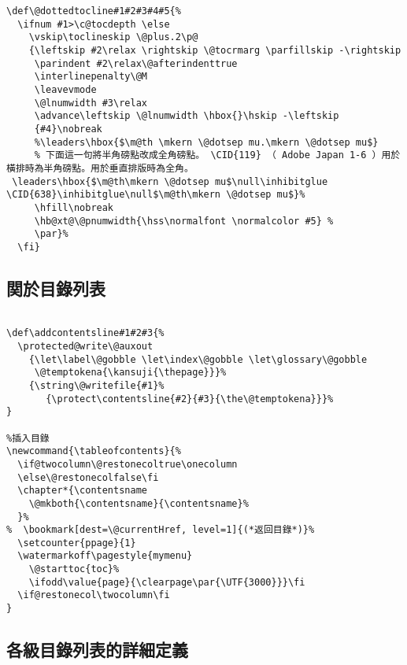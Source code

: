 \begin{lstlisting}[firstnumber=1255]
\def\@dottedtocline#1#2#3#4#5{%
  \ifnum #1>\c@tocdepth \else
    \vskip\toclineskip \@plus.2\p@
    {\leftskip #2\relax \rightskip \@tocrmarg \parfillskip -\rightskip
     \parindent #2\relax\@afterindenttrue
     \interlinepenalty\@M
     \leavevmode
     \@lnumwidth #3\relax
     \advance\leftskip \@lnumwidth \hbox{}\hskip -\leftskip
     {#4}\nobreak
     %\leaders\hbox{$\m@th \mkern \@dotsep mu.\mkern \@dotsep mu$}
     % 下面這一句將半角磅點改成全角磅點。 \CID{119} （ Adobe Japan 1-6 ）用於橫排時為半角磅點。用於垂直排版時為全角。
 \leaders\hbox{$\m@th\mkern \@dotsep mu$\null\inhibitglue \CID{638}\inhibitglue\null$\m@th\mkern \@dotsep mu$}%
     \hfill\nobreak
     \hb@xt@\@pnumwidth{\hss\normalfont \normalcolor #5} %
     \par}%
  \fi}
\end{lstlisting}

\subsection{関於目錄列表}

\begin{lstlisting}[firstnumber=1272]
% 在 class 里把关于頁碼的内容放到  \AtBeginDocument 里（見 class 末尾）

\def\addcontentsline#1#2#3{%
  \protected@write\@auxout
    {\let\label\@gobble \let\index\@gobble \let\glossary\@gobble
     \@temptokena{\kansuji{\thepage}}}%
    {\string\@writefile{#1}%
       {\protect\contentsline{#2}{#3}{\the\@temptokena}}}%
}

%插入目錄
\newcommand{\tableofcontents}{%
  \if@twocolumn\@restonecoltrue\onecolumn
  \else\@restonecolfalse\fi
  \chapter*{\contentsname
    \@mkboth{\contentsname}{\contentsname}%
  }%
%  \bookmark[dest=\@currentHref, level=1]{(*返回目錄*)}%
  \setcounter{ppage}{1}
  \watermarkoff\pagestyle{mymenu}
    \@starttoc{toc}%
    \ifodd\value{page}{\clearpage\par{\UTF{3000}}}\fi
  \if@restonecol\twocolumn\fi
}
\end{lstlisting}

\subsection{各級目錄列表的詳細定義}

